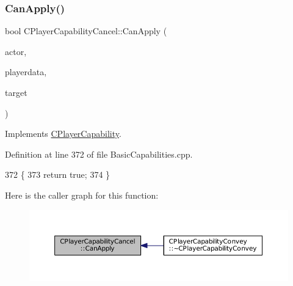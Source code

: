 \subsubsection{\texorpdfstring{Can\+Apply()}{CanApply()}}
{\footnotesize\ttfamily bool C\+Player\+Capability\+Cancel\+::\+Can\+Apply (\begin{DoxyParamCaption}\item[{std\+::shared\+\_\+ptr$<$ \hyperlink{classCPlayerAsset}{C\+Player\+Asset} $>$}]{actor,  }\item[{std\+::shared\+\_\+ptr$<$ \hyperlink{classCPlayerData}{C\+Player\+Data} $>$}]{playerdata,  }\item[{std\+::shared\+\_\+ptr$<$ \hyperlink{classCPlayerAsset}{C\+Player\+Asset} $>$}]{target }\end{DoxyParamCaption})\hspace{0.3cm}{\ttfamily [virtual]}}



Implements \hyperlink{classCPlayerCapability_ae96263e0950f496492f8baeb877b9554}{C\+Player\+Capability}.



Definition at line 372 of file Basic\+Capabilities.\+cpp.


\begin{DoxyCode}
372                                                                                                            
                                                   \{
373     \textcolor{keywordflow}{return} \textcolor{keyword}{true};
374 \}
\end{DoxyCode}
Here is the caller graph for this function\+:
\nopagebreak
\begin{figure}[H]
\begin{center}
\leavevmode
\includegraphics[width=350pt]{classCPlayerCapabilityCancel_a0221e4e768c998cb46f1dbc757647ec1_icgraph}
\end{center}
\end{figure}
\hypertarget{classCPlayerCapabilityCancel_a8b4ad4a4983b01e458d439cf68fd2ba9}{}\label{classCPlayerCapabilityCancel_a8b4ad4a4983b01e458d439cf68fd2ba9} 
